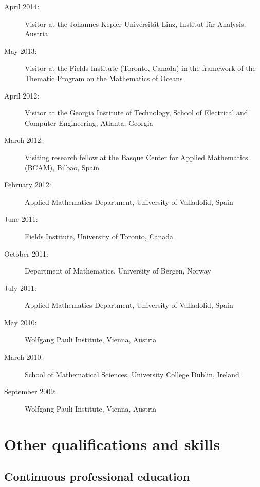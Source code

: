\documentclass[final, a4paper, oneside, 12pt]{article}
\numberwithin{equation}{section}
\begin{document}
\begin{description}
  \item [April 2014:] Visitor at the Johannes Kepler Universit\"at Linz, Institut f\"ur Analysis, Austria
  
  \item[May 2013:] Visitor at the Fields Institute (Toronto, Canada) in the framework of the Thematic Program on the Mathematics of Oceans
  
  \item[April 2012:] Visitor at the Georgia Institute of Technology, School of Electrical and Computer Engineering, Atlanta, Georgia
  
  \item[March 2012:] Visiting research fellow at the Basque Center for Applied Mathematics (BCAM), Bilbao, Spain
  
  \item[February 2012:] Applied Mathematics Department, University of Valladolid, Spain
  
  \item[June 2011:] Fields Institute, University of Toronto, Canada
  
  \item[October 2011:] Department of Mathematics, University of Bergen, Norway
  
  \item[July 2011:] Applied Mathematics Department, University of Valladolid, Spain
  
  \item[May 2010:] Wolfgang Pauli Institute, Vienna, Austria
  
  \item[March 2010:] School of Mathematical Sciences, University College Dublin, Ireland
  
  \item[September 2009:] Wolfgang Pauli Institute, Vienna, Austria
  
\end{description}


\section{Other qualifications and skills}

\subsection{Continuous professional education}
\end{document}
